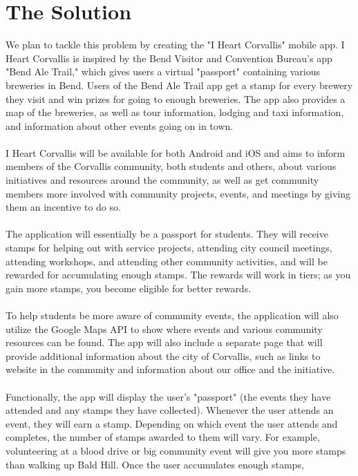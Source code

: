 \documentclass[draftclsnofoot, onecolumn, 10pt, compsoc]{IEEEtran}
\begin{document}
	\section{The Solution}
		We plan to tackle this problem by creating the "I Heart Corvallis" mobile app. I Heart Corvallis is inspired by the Bend 
		Visitor and Convention Bureau's app "Bend Ale Trail," which gives users a virtual "passport" containing various 
		breweries in Bend. Users of the Bend Ale Trail app get a stamp for every brewery they visit and win prizes for going to 
		enough breweries. The app also provides a map of the breweries, as well as tour information, lodging and taxi 
		information, and information about other events going on in town. \\ \\
		I Heart Corvallis will be available for both Android and iOS and aims to 
		inform members of the Corvallis community, both students and others, about various initiatives and resources around 
		the community, as well as get community members more involved with community projects, events, and meetings by 
		giving them an incentive to do so. \\ \\			
		The application will essentially be a passport for students. They will receive stamps for helping out with service 
		projects, attending city council meetings, attending workshops, and attending other community activities, and will be 
		rewarded for accumulating enough stamps. The rewards will work in tiers; as you gain more stamps, you become 
		eligible for better rewards. \\ \\			
		To help students be more aware of community events, the application will also utilize the Google Maps API to show 
		where events and various community resources can be found. The app will also include a separate page that will 
		provide additional information about the city of Corvallis, such as links to website in the community and information 
		about our office and the initiative. \\ \\			
		Functionally, the app will display the user's "passport" (the events they have attended and any stamps they have 
		collected). Whenever the user attends an event, they will earn a stamp. Depending on which event the user attends 
		and completes, the number of stamps awarded to them will vary. For example, volunteering at a blood drive or big 
		community event will give you more stamps than walking up Bald Hill. Once the user accumulates enough stamps, 
\end{document}
